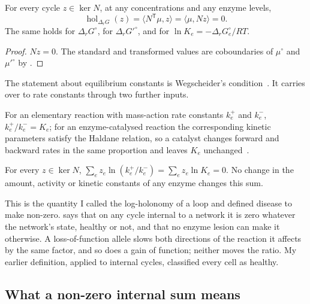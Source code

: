 \begin{theorem}
\label{c1:thm-internal}
\lnkD{} For every cycle $z\in\ker N$, at any concentrations and any enzyme
levels,
\begin{equation}
\operatorname{hol}_{\Delta_rG}(z)=\langle N^{\mathsf T}\mu,z\rangle
=\langle\mu,Nz\rangle=0 .
\label{c1:eq-internal}
\end{equation}
The same holds for $\Delta_rG^{\circ}$, for $\Delta_rG'^{\circ}$, and for
$\ln K_e=-\Delta_rG^{\circ}_e/RT$.
\end{theorem}

\begin{proof}
$Nz=0$. The standard and transformed values are coboundaries of $\mu^{\circ}$
and $\mu'^{\circ}$ by .
\end{proof}

The statement about equilibrium constants is Wegscheider's
condition~\citep{Wegscheider1901}. It carries over to rate constants
through two further inputs.

\begin{inputstmt}
\label{c1:in-haldane}
\lnkS{} For an elementary reaction with mass-action rate constants $k^+_e$
and $k^-_e$, $k^+_e/k^-_e=K_e$; for an enzyme-catalysed reaction the
corresponding kinetic parameters satisfy the Haldane relation, so a catalyst
changes forward and backward rates in the same proportion and leaves $K_e$
unchanged~\citep{haldane1930,Wegscheider1901}.
\end{inputstmt}

\begin{corollary}
\label{c1:cor-rates}
\lnkD{} For every $z\in\ker N$,
$\sum_e z_e\ln(k^+_e/k^-_e)=\sum_e z_e\ln K_e=0$. No change in the amount,
activity or kinetic constants of any enzyme changes this sum.
\end{corollary}

This is the quantity I called the log-holonomy of a loop and defined disease
to make non-zero.  says that on any cycle internal to a
network it is zero whatever the network's state, healthy or not, and that no
enzyme lesion can make it otherwise. A loss-of-function allele slows both
directions of the reaction it affects by the same factor, and so does a
gain of function; neither moves the ratio. My earlier definition, applied
to internal cycles, classified every cell as healthy.

\subsection*{What a non-zero internal sum means}

